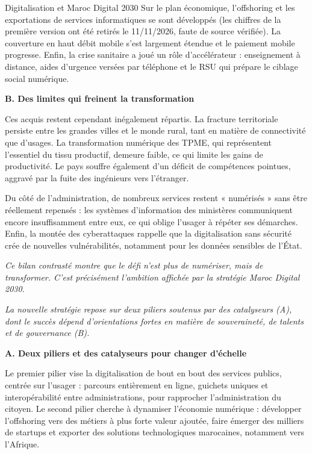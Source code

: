 \begin{copiemodele}{Digitalisation et Maroc Digital 2030}
Sur le plan économique, l'offshoring et les exportations de services informatiques se sont développés (les chiffres de la première version ont été retirés le 11/11/2026, faute de source vérifiée). La couverture en haut débit mobile s'est largement étendue et le paiement mobile progresse. Enfin, la crise sanitaire a joué un rôle d'accélérateur : enseignement à distance, aides d'urgence versées par téléphone et le RSU qui prépare le ciblage social numérique.

\textbf{B. Des limites qui freinent la transformation}

Ces acquis restent cependant inégalement répartis. La fracture territoriale persiste entre les grandes villes et le monde rural, tant en matière de connectivité que d'usages. La transformation numérique des TPME, qui représentent l'essentiel du tissu productif, demeure faible, ce qui limite les gains de productivité. Le pays souffre également d'un déficit de compétences pointues, aggravé par la fuite des ingénieurs vers l'étranger.

Du côté de l'administration, de nombreux services restent « numérisés » sans être réellement repensés : les systèmes d'information des ministères communiquent encore insuffisamment entre eux, ce qui oblige l'usager à répéter ses démarches. Enfin, la montée des cyberattaques rappelle que la digitalisation sans sécurité crée de nouvelles vulnérabilités, notamment pour les données sensibles de l'État.

\textit{Ce bilan contrasté montre que le défi n'est plus de numériser, mais de transformer. C'est précisément l'ambition affichée par la stratégie Maroc Digital 2030.}

\textit{La nouvelle stratégie repose sur deux piliers soutenus par des catalyseurs (A), dont le succès dépend d'orientations fortes en matière de souveraineté, de talents et de gouvernance (B).}

\textbf{A. Deux piliers et des catalyseurs pour changer d'échelle}

Le premier pilier vise la digitalisation de bout en bout des services publics, centrée sur l'usager : parcours entièrement en ligne, guichets uniques et interopérabilité entre administrations, pour rapprocher l'administration du citoyen. Le second pilier cherche à dynamiser l'économie numérique : développer l'offshoring vers des métiers à plus forte valeur ajoutée, faire émerger des milliers de startups et exporter des solutions technologiques marocaines, notamment vers l'Afrique.


\end{copiemodele}
